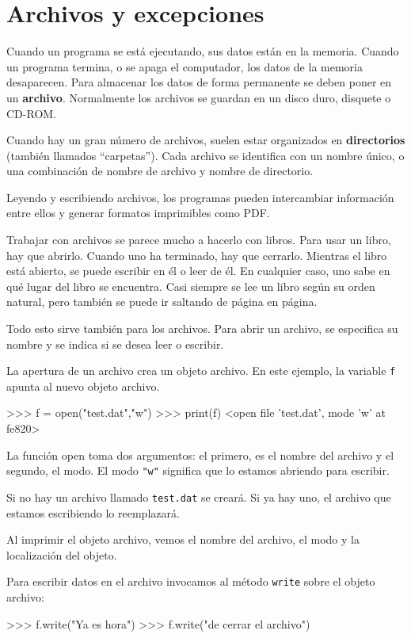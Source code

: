 
\chapter{Archivos y excepciones}


Cuando un programa se está ejecutando, sus datos están en la memoria.
Cuando un programa termina, o se apaga el computador, los datos de
la memoria desaparecen. Para almacenar los datos de forma permanente
se deben poner en un \textbf{archivo}. Normalmente los archivos se
guardan en un disco duro, disquete o CD-ROM.

Cuando hay un gran número de archivos, suelen estar organizados en
\textbf{directorios} (también llamados ``carpetas''). Cada archivo
se identifica con un nombre único, o una combinación de nombre de
archivo y nombre de directorio.

Leyendo y escribiendo archivos, los programas pueden intercambiar
información entre ellos y generar formatos imprimibles como PDF.

Trabajar con archivos se parece mucho a hacerlo con libros. Para usar
un libro, hay que abrirlo. Cuando uno ha terminado, hay que cerrarlo.
Mientras el libro está abierto, se puede escribir en él o leer de
él. En cualquier caso, uno sabe en qué lugar del libro se encuentra.
Casi siempre se lee un libro según su orden natural, pero también
se puede ir saltando de página en página.

Todo esto sirve también para los archivos. Para abrir un archivo,
se especifica su nombre y se indica si se desea leer o escribir.

La apertura de un archivo crea un objeto archivo. En este ejemplo,
la variable \texttt{f} apunta al nuevo objeto archivo.
\begin{pyconcode}
>>> f = open("test.dat","w")
>>> print(f)
<open file 'test.dat', mode 'w' at fe820>
\end{pyconcode}

La función open toma dos argumentos: el primero, es el nombre del
archivo y el segundo, el modo. El modo {\verb+"w"+} significa que
lo estamos abriendo para escribir.

Si no hay un archivo llamado \texttt{test.dat} se creará. Si ya hay
uno, el archivo que estamos escribiendo lo reemplazará.

Al imprimir el objeto archivo, vemos el nombre del archivo, el modo
y la localización del objeto.

Para escribir datos en el archivo invocamos al método \texttt{write}
sobre el objeto archivo:
\begin{pyconcode}
>>> f.write("Ya es hora")
>>> f.write("de cerrar el archivo")
\end{pyconcode}

